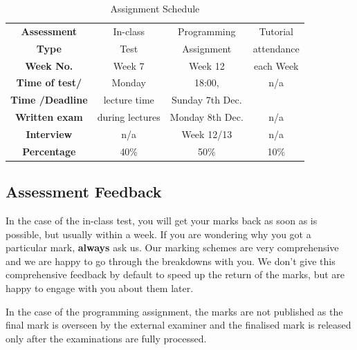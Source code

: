 \documentclass{article}
\begin{document}
  \begin{table}
    \begin{center}
        \begin{tabular}{|c|c|c|c|}
            \hline
            \rowcolor{red!60}
            \textbf{Assessment} & In-class & Programming & Tutorial  \\
            \rowcolor{red!60}
            \textbf{Type} & Test & Assignment &  attendance \\
    

            \hline
            \rowcolor{red!30}
            \textbf{Week No.} & Week 7 & Week 12 & each Week \\
            \hline
            \rowcolor{red!30}
            \textbf{Time of test/} & Monday  & 18:00,  & n/a \\
            \rowcolor{red!30}
            
            \textbf{Time /Deadline} & lecture time& Sunday 7th Dec.& \\
            \hline
            \rowcolor{red!35}
            \textbf{Written exam} & during lectures & Monday 8th Dec. & n/a \\
            \hline
            \rowcolor{red!40}
            \textbf{Interview} & n/a & Week 12/13 & n/a \\
            \hline
            \rowcolor{red!60}
            \textbf{Percentage} & 40\% & 50\% & 10\% \\
            \hline
        \end{tabular}
        \caption{Assignment Schedule}
        \label{tab:ass-schedule}
    \end{center}
\end{table}



\subsection{Assessment Feedback}

In the case of the in-class test, you will get your marks back as soon as is possible, but usually within a week. 
If you are wondering why you got a particular mark, \textbf{always} ask us. Our marking schemes are very comprehensive and 
we are happy to go through the breakdowns with you. 
We don't give this comprehensive feedback by default to speed up the return of the marks, but are happy to engage with you  about them later. 

In the case of the programming  assignment, the marks are not published as the final mark is overseen by the external examiner and the 
finalised mark is released only after the examinations are fully processed.
\end{document}
